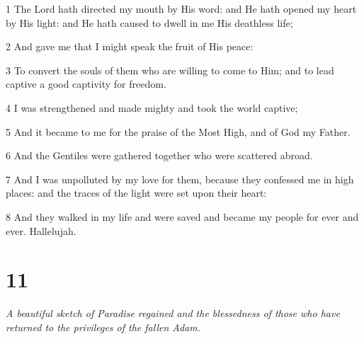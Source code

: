 \par 1 The Lord hath directed my mouth by His word: and He hath opened my heart by His light: and He hath caused to dwell in me His deathless life;
\par 2 And gave me that I might speak the fruit of His peace:
\par 3 To convert the souls of them who are willing to come to Him; and to lead captive a good captivity for freedom.
\par 4 I was strengthened and made mighty and took the world captive;
\par 5 And it became to me for the praise of the Most High, and of God my Father.
\par 6 And the Gentiles were gathered together who were scattered abroad.
\par 7 And I was unpolluted by my love for them, because they confessed me in high places: and the traces of the light were set upon their heart:
\par 8 And they walked in my life and were saved and became my people for ever and ever. Hallelujah.

\chapter{11}

\par \textit{A beautiful sketch of Paradise regained and the blessedness of those who have returned to the privileges of the fallen Adam.}

